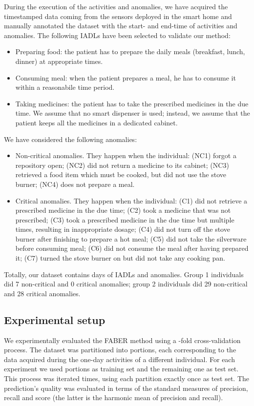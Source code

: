 \documentclass[10pt, conference, compsocconf]{IEEEtran}
\begin{document}
During the execution of the activities and anomalies, we have acquired the timestamped data coming from the sensors deployed in the smart home and manually annotated the dataset with the start- and end-time of activities and anomalies. 
The following IADLs have been selected to validate our method: 
\begin{itemize}
\item Preparing food: the patient has to prepare the daily meals (breakfast, lunch, dinner) at appropriate times.
\item Consuming meal: when the patient prepares a meal, he has to consume it within a reasonabile time period.
\item Taking medicines: the patient has to take the prescribed medicines in the due time. We assume that no smart dispenser is used; instead, we assume that the patient keeps all the medicines in a dedicated cabinet.
\end{itemize}
We have considered the following anomalies:
\begin{itemize}
\item Non-critical anomalies. They happen when the individual: (NC1) forgot a repository open; (NC2) did not return a medicine to its cabinet; (NC3) retrieved a food item which must be cooked, but did not use the stove burner; (NC4) does not prepare a meal.
\item Critical anomalies. They happen when the individual: (C1) did not retrieve a prescribed medicine in the due time; (C2) took a medicine that was not prescribed; (C3) took a prescribed medicine in the due time but multiple times, resulting in inappropriate dosage; (C4) did not turn off the stove burner after finishing to prepare a hot meal; (C5) did not take the silverware before consuming meal; (C6) did not consume the meal after having prepared it; (C7) turned the stove burner on but did not take any cooking pan.
\end{itemize}

Totally, our dataset contains  days of IADLs and anomalies. Group 1 individuals did 7 non-critical and 0 critical anomalies; group 2 individuals did 29 non-critical and 28 critical anomalies.

 

\subsection{Experimental setup}
We experimentally evaluated the FABER method using
a -fold cross-validation process. The dataset was partitioned into 
 portions, each corresponding to the data acquired during the one-day
activities of a different individual. For each experiment we used    
portions as training set and the remaining one as test set. This process was
iterated  times, using each partition exactly once as test set. 
The prediction's quality was evaluated in terms of the standard measures of precision,
recall and  score (the latter is the harmonic mean of precision and recall). 
\end{document}
